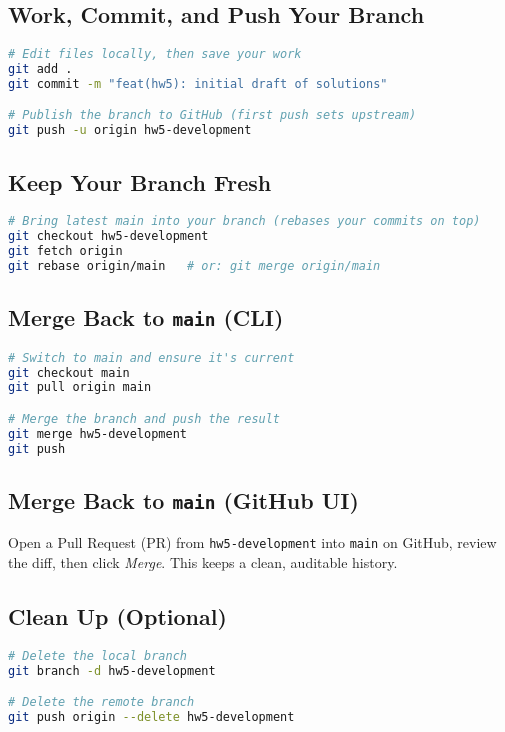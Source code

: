 \documentclass[11pt,letterpaper]{article}
\newcommand{\code}[1]{\textcolor{codeorange}{\texttt{#1}}}
\begin{document}
\subsection{Work, Commit, and Push Your Branch}
\begin{lstlisting}[language=bash]
# Edit files locally, then save your work
git add .
git commit -m "feat(hw5): initial draft of solutions"

# Publish the branch to GitHub (first push sets upstream)
git push -u origin hw5-development
\end{lstlisting}

\subsection{Keep Your Branch Fresh}
\begin{lstlisting}[language=bash]
# Bring latest main into your branch (rebases your commits on top)
git checkout hw5-development
git fetch origin
git rebase origin/main   # or: git merge origin/main
\end{lstlisting}

\subsection{Merge Back to \code{main} (CLI)}
\begin{lstlisting}[language=bash]
# Switch to main and ensure it's current
git checkout main
git pull origin main

# Merge the branch and push the result
git merge hw5-development
git push
\end{lstlisting}

\subsection{Merge Back to \code{main} (GitHub UI)}
Open a Pull Request (PR) from \code{hw5-development} into \code{main} on GitHub, review the diff, then click \textit{Merge}. This keeps a clean, auditable history.

\subsection{Clean Up (Optional)}
\begin{lstlisting}[language=bash]
# Delete the local branch
git branch -d hw5-development

# Delete the remote branch
git push origin --delete hw5-development
\end{lstlisting}
\end{document}
